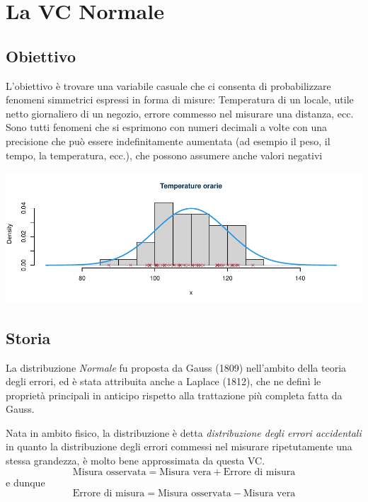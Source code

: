 \documentclass[
  11pt,
]{book}
\theoremstyle{mytheoremstyle}
\theoremstyle{mydefstyle}
\begin{document}
\section{La VC Normale}\label{la-vc-normale}

\subsection{Obiettivo}\label{obiettivo-1}

L'obiettivo è trovare una variabile casuale che ci consenta di probabilizzare fenomeni simmetrici espressi in forma di misure:
Temperatura di un locale, utile netto giornaliero di un negozio, errore commesso nel misurare una distanza, ecc.
Sono tutti fenomeni che si esprimono con numeri decimali a volte con una precisione che può essere indefinitamente aumentata (ad esempio il peso, il tempo, la temperatura, ecc.), che possono assumere anche valori negativi

\begin{center}\includegraphics{Appunti_di_Statistica_2025_files/figure-latex/07c-Normale-1,-1} \end{center}

\subsection{Storia}\label{storia-1}

La distribuzione \emph{Normale} fu proposta da Gauss (1809) nell'ambito della teoria degli errori, ed
è stata attribuita anche a Laplace (1812), che ne definì le proprietà principali in anticipo rispetto alla trattazione più completa fatta da Gauss.

Nata in ambito fisico, la distribuzione è detta \emph{distribuzione degli errori accidentali} in quanto la distribuzione degli errori commessi nel misurare ripetutamente una stessa grandezza, è molto bene approssimata da questa VC.
\[\text{Misura osservata}=\text{Misura vera}+\text{Errore di misura}\]
e dunque
\[\text{Errore di misura}=\text{Misura osservata}-\text{Misura vera}\]
\end{document}
